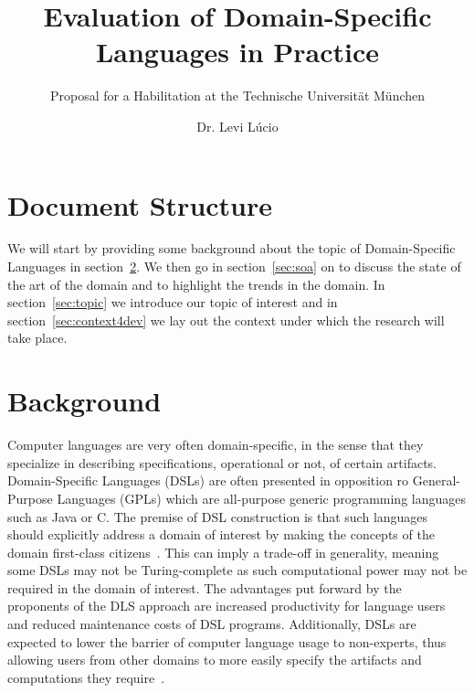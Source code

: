 \documentclass{scrartcl}
\begin{document}
\title{Evaluation of Domain-Specific Languages in Practice\\}
\subtitle{Proposal for a Habilitation at the Technische Universit\"at M\"unchen}

\author{Dr. Levi L\'ucio}

\maketitle


\section{Document Structure}

We will start by providing some background about the topic of Domain-Specific
Languages in section~\ref{sec:background}. We then go in
section~\ref{sec:soa} on to discuss the state of the art of the domain and to
highlight the trends in the domain. In section~\ref{sec:topic} we introduce our
topic of interest and in section~\ref{sec:context4dev} we lay out the context
under which the research will take place.

\section{Background}
\label{sec:background}

Computer languages are very often domain-specific, in the sense that they
specialize in describing specifications, operational or not, of certain
artifacts. Domain-Specific Languages (DSLs) are often presented in opposition ro
General-Purpose Languages (GPLs) which are all-purpose generic programming
languages such as Java or C. The premise of DSL construction is that such
languages should explicitly address a domain of interest by making the concepts
of the domain first-class citizens~\cite{Kolovos06}. This can imply a trade-off
in generality, meaning some DSLs may not be Turing-complete as such
computational power may not be required in the domain of interest. The
advantages put forward by the proponents of the DLS approach are increased
productivity for language users and reduced maintenance costs of DSL programs.
Additionally, DSLs are expected to lower the barrier of computer language usage
to non-experts, thus allowing users from other domains to more easily specify
the artifacts and computations they require~\cite{MernikHS05}.
\end{document}
